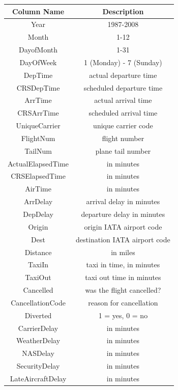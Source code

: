 \documentclass[9pt,twocolumn,twoside]{../../styles/osajnl}
\begin{document}
\begin{enumerate}
    \begin{table}
    \begin{tabular}{|c|c|}
        \hline
        \textbf{Column Name} & \textbf{Description} \\ \hline
        Year & 1987-2008  \\ \hline
        Month & 1-12  \\ \hline
        DayofMonth & 1-31  \\ \hline
        DayOfWeek & 1 (Monday) - 7 (Sunday)  \\ \hline
        DepTime & actual departure time   \\ \hline    
        CRSDepTime & scheduled departure time  \\ \hline
        ArrTime & actual arrival time \\ \hline
        CRSArrTime & scheduled arrival time  \\ \hline
        UniqueCarrier & unique carrier code  \\ \hline
        FlightNum & flight number  \\ \hline
        TailNum & plane tail number  \\ \hline
        ActualElapsedTime & in minutes  \\ \hline
        CRSElapsedTime & in minutes  \\ \hline
        AirTime & in minutes  \\ \hline
        ArrDelay & arrival delay in minutes  \\ \hline
        DepDelay & departure delay in minutes  \\ \hline
        Origin & origin IATA airport code  \\ \hline
        Dest & destination IATA airport code  \\ \hline
        Distance & in miles  \\ \hline
        TaxiIn & taxi in time, in minutes  \\ \hline
        TaxiOut & taxi out time in minutes  \\ \hline
        Cancelled & was the flight cancelled?  \\ \hline
        CancellationCode & reason for cancellation  \\ \hline
        Diverted & 1 = yes, 0 = no  \\ \hline
        CarrierDelay & in minutes  \\ \hline
        WeatherDelay & in minutes  \\ \hline
        NASDelay & in minutes  \\ \hline
        SecurityDelay & in minutes  \\ \hline
        LateAircraftDelay & in minutes  \\ \hline


\end{tabular}
\end{table}
\end{enumerate}
\end{document}

